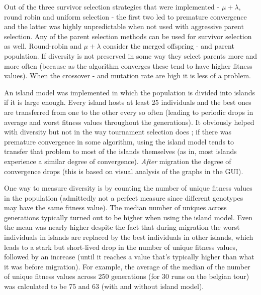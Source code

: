 
Out of the three survivor selection strategies that were implemented - $\mu+\lambda$, round robin and uniform selection - the first two led to premature convergence and the latter was highly unpredictable when not used with aggressive parent selection. Any of the parent selection methods can be used for survivor selection as well. Round-robin and $\mu+\lambda$ consider the merged offspring - and parent population. If diversity is not preserved in some way they select parents more and more often (because as the algorithm converges these tend to have higher fitness values). When the crossover - and mutation rate are high it is less of a problem.


An island model was implemented in which the population is divided into islands if it is large enough. Every island hosts at least 25 individuals and the best ones are transferred from one to the other every so often (leading to periodic drops in average and worst fitness values throughout the generations). It obviously helped with diversity but not in the way tournament selection does ; if there was premature convergence in some algorithm, using the island model tends to transfer that problem to most of the islands themselves (as in, most islands experience a similar degree of convergence). \textit{After} migration the degree of convergence drops (this is based on visual analysis of the graphs in the GUI). \\

\par\noindent One way to measure diversity is by counting the number of unique fitness values in the population (admittedly not a perfect measure since different genotypes may have the same fitness value). The median number of uniques across generations typically turned out to be higher when using the island model. Even the mean was nearly higher despite the fact that during migration the worst individuals in islands are replaced by the best individuals in other islands, which leads to a stark but short-lived drop in the number of unique fitness values, followed by an increase (until it reaches a value that's typically higher than what it was before migration). For example, the average of the median of the number of unique fitness values across 250 generations (for 30 runs on the belgian tour) was calculated to be 75 and 63 (with and without island model).


